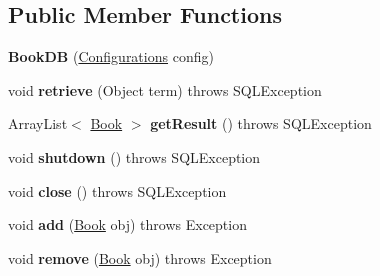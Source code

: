 \subsection*{Public Member Functions}
\begin{DoxyCompactItemize}
\item 
\hypertarget{classw3se_1_1_model_1_1_database_1_1_book_d_b_a9507c329805e128675aaadf224900ce2}{{\bfseries Book\-D\-B} (\hyperlink{classw3se_1_1_model_1_1_configurations}{Configurations} config)}\label{classw3se_1_1_model_1_1_database_1_1_book_d_b_a9507c329805e128675aaadf224900ce2}

\item 
\hypertarget{classw3se_1_1_model_1_1_database_1_1_book_d_b_a72c872038f55a050873364ced3b39f50}{void {\bfseries retrieve} (Object term)  throws S\-Q\-L\-Exception 	}\label{classw3se_1_1_model_1_1_database_1_1_book_d_b_a72c872038f55a050873364ced3b39f50}

\item 
\hypertarget{classw3se_1_1_model_1_1_database_1_1_book_d_b_a14224e84efb9d553a57a9ac03f7e18d7}{Array\-List$<$ \hyperlink{classw3se_1_1_model_1_1_base_1_1_book}{Book} $>$ {\bfseries get\-Result} ()  throws S\-Q\-L\-Exception 	}\label{classw3se_1_1_model_1_1_database_1_1_book_d_b_a14224e84efb9d553a57a9ac03f7e18d7}

\item 
\hypertarget{classw3se_1_1_model_1_1_database_1_1_book_d_b_ae15c19b32af97d61803fd4353cf1663c}{void {\bfseries shutdown} ()  throws S\-Q\-L\-Exception 	}\label{classw3se_1_1_model_1_1_database_1_1_book_d_b_ae15c19b32af97d61803fd4353cf1663c}

\item 
\hypertarget{classw3se_1_1_model_1_1_database_1_1_book_d_b_a77236791b700d2d906ede77768072365}{void {\bfseries close} ()  throws S\-Q\-L\-Exception 	}\label{classw3se_1_1_model_1_1_database_1_1_book_d_b_a77236791b700d2d906ede77768072365}

\item 
\hypertarget{classw3se_1_1_model_1_1_database_1_1_book_d_b_a92164bfd484f6397c50fb5a5cd421dee}{void {\bfseries add} (\hyperlink{classw3se_1_1_model_1_1_base_1_1_book}{Book} obj)  throws Exception 	}\label{classw3se_1_1_model_1_1_database_1_1_book_d_b_a92164bfd484f6397c50fb5a5cd421dee}

\item 
\hypertarget{classw3se_1_1_model_1_1_database_1_1_book_d_b_a81d8a1774efe47afbcb6381dca37ff74}{void {\bfseries remove} (\hyperlink{classw3se_1_1_model_1_1_base_1_1_book}{Book} obj)  throws Exception 	}\label{classw3se_1_1_model_1_1_database_1_1_book_d_b_a81d8a1774efe47afbcb6381dca37ff74}

\end{DoxyCompactItemize}
